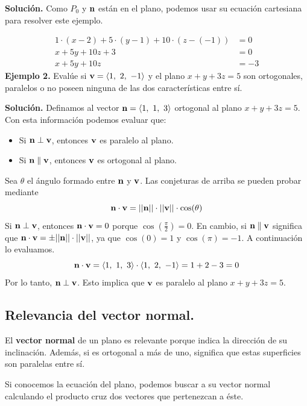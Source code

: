 \documentclass[12pt]{article}
\begin{document}
\textbf{Solución.} Como $P_{0}$ y $\mathbf{n}$ están en el plano, podemos usar su ecuación cartesiana para resolver este ejemplo.

\begin{align*}
  1 \cdot (x - 2) + 5 \cdot (y - 1) + 10 \cdot (z - (-1)) &= 0 \\
  x + 5y + 10z + 3 &= 0 \\
  x + 5y + 10z &= -3
\end{align*}
\textbf{Ejemplo 2.} Evalúe si $\mathbf{v} = \langle 1, \ 2, \ -1 \rangle$ y el plano $x + y + 3z = 5$ son ortogonales, paralelos o no poseen ninguna de las dos características entre sí.

\textbf{Solución.} Definamos al vector $\mathbf{n} = \langle 1, \ 1, \ 3 \rangle$ ortogonal al plano $x + y + 3z = 5$. Con esta información podemos evaluar que:

\begin{itemize}
\item Si $\mathbf{n} \perp \mathbf{v}$, entonces $\mathbf{v}$ es paralelo al plano.
\item Si $\mathbf{n} \parallel \mathbf{v}$, entonces $\mathbf{v}$ es ortogonal al plano.
\end{itemize}

Sea $\theta$ el ángulo formado entre $\mathbf{n}$ y $\mathbf{v}$. Las conjeturas de arriba se pueden probar mediante
\[
  \mathbf{n} \cdot \mathbf{v} = ||\mathbf{n}|| \cdot ||\mathbf{v}|| \cdot \cos(\theta)
\]
Si $\mathbf{n} \perp \mathbf{v}$, entonces $\mathbf{n} \cdot \mathbf{v} = 0$ porque $\cos\left(\frac{\pi}{2}\right) = 0$. En cambio, si $\mathbf{n} \parallel \mathbf{v}$ significa que $\mathbf{n} \cdot \mathbf{v} = \pm ||\mathbf{n}|| \cdot ||\mathbf{v}||$, ya que $\cos(0) = 1$ y $\cos(\pi) = -1$. A continuación lo evaluamos.
\[
  \vecmat{n} \cdot \vecmat{v} = \langle 1, \ 1, \ 3 \rangle \cdot \langle 1, \ 2, \ -1 \rangle = 1 + 2 - 3 = 0
\]
Por lo tanto, $\mathbf{n} \perp \mathbf{v}$. Esto implica que $\mathbf{v}$ es paralelo al plano $x + y + 3z = 5$.

\subsection{Relevancia del vector normal.}

El \textbf{vector normal} de un plano es relevante porque indica la dirección de su inclinación. Además, si es ortogonal a más de uno, significa que estas superficies son paralelas entre sí.

Si conocemos la ecuación del plano, podemos buscar a su vector normal calculando el producto cruz dos vectores que pertenezcan a éste.
\end{document}
